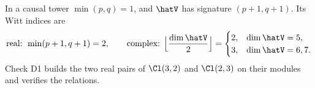 In a causal tower $\min(p,q) = 1$, and $\hatV$ has signature $(p+1, q+1)$. Its Witt indices are
\[
\text{real: } \min(p+1, q+1) = 2, \qquad
\text{complex: } \Bigl\lfloor \frac{\dim\hatV}{2} \Bigr\rfloor =
\begin{cases} 2, & \dim\hatV = 5, \\ 3, & \dim\hatV = 6, 7. \end{cases}
\]
Check D1 builds the two real pairs of $\Cl(3,2)$ and $\Cl(2,3)$ on their modules and verifies the relations.
